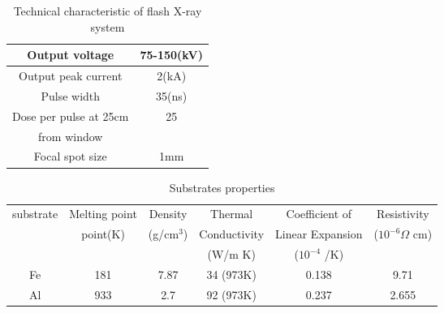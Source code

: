 

\begin{table}[p]
\begin{center}
\begin{tabular}{c||c} \hline
Output voltage & 75-150(kV) \\\hline
Output peak current & 2(kA) \\\hline
Pulse width & 35(ns) \\\hline
Dose per pulse at 25cm & \multicolumn{1}{c}{25} \\
from window & \multicolumn{1}{c}{} \\\hline
Focal spot size & 1mm \\\hline
\end{tabular}
\end{center}
\caption{Technical characteristic of flash X-ray system}
\label{tab:Xray仕様}

\end{table}

\begin{table}[h]
\begin{center}
\begin{tabular}{c|c|c|c|c|c}\hline\hline
\multicolumn{1}{c|}{substrate} & \multicolumn{1}{c|}{Melting point} & 
\multicolumn{1}{c|}{Density} & \multicolumn{1}{c|}{Thermal} & 
\multicolumn{1}{c|}{Coefficient of} & \multicolumn{1}{c}{Resistivity} \\
\multicolumn{1}{c|}{} & \multicolumn{1}{c|}{point(K)} & 
\multicolumn{1}{c|}{(g/cm$^3$)} & \multicolumn{1}{c|}{Conductivity} & 
\multicolumn{1}{c|}{Linear Expansion} & \multicolumn{1}{c}{($10^{-6} \Omega$ cm)} \\
\multicolumn{1}{c|}{} & \multicolumn{1}{c|}{} & 
\multicolumn{1}{c|}{} & \multicolumn{1}{c|}{(W/m K)} & 
\multicolumn{1}{c|}{($10^{-4}$ /K)} & \multicolumn{1}{c}{} \\\hline\hline
Fe & 181 & 7.87 & 34 (973K) & 0.138 & 9.71 \\\hline
Al & 933 & 2.7 & 92 (973K)& 0.237 & 2.655 \\\hline
\end{tabular}
\end{center}

\caption{Substrates properties}
\label{基板性質}

\end{table}


